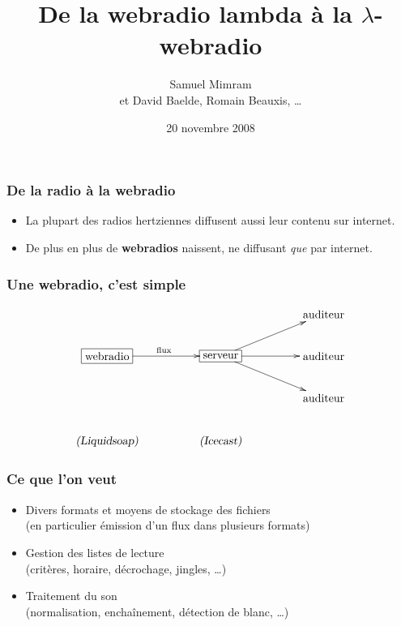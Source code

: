 \documentclass{beamer}
\title{De la webradio lambda à la $\lambda$-webradio}
\author{Samuel Mimram\\{\tiny et David Baelde, Romain Beauxis, \ldots}}
\institute{Groupe de Travail Programmation}
\date{20 novembre 2008}
\begin{document}
\begin{frame}
  \titlepage
\end{frame}

\newenvironment{ssl}[1]{\begin{frame}\frametitle{#1}}{\end{frame}}

\begin{frame}
  \frametitle{De la radio à la webradio}

  \begin{itemize}
  \item La plupart des radios hertziennes diffusent aussi leur contenu sur
    internet.
  \item<2-> De plus en plus de \textbf{webradios} naissent, ne diffusant
    \emph{que} par internet.
  \end{itemize}
\end{frame}

\begin{frame}
  \frametitle{Une webradio, c'est simple}

  \[
  \xymatrix@C=4pc{
    &&*+{\text{auditeur}}\\
    *+[F]{\text{webradio}}\ar[r]^{\text{flux}}&
    *+[F]{\text{serveur}}
    \ar[ur]\ar[r]\ar[dr]&
    *+{\text{auditeur}}\\
    &&*+{\text{auditeur}}\\
    {\textsl{(Liquidsoap)}}&{\textsl{(Icecast)}}\\
  }
  \]
\end{frame}

\begin{frame}
  \frametitle{Ce que l'on veut}

  \begin{itemize}
  \item Divers formats et moyens de stockage des fichiers\\
    (en particulier émission d'un flux dans plusieurs formats) %
  \item Gestion des listes de lecture\\
    (critères, horaire, décrochage, jingles, \ldots)
  \item Traitement du son\\
    (normalisation, enchaînement, détection de blanc, \ldots)
  \end{itemize}
\end{frame}
\end{document}
